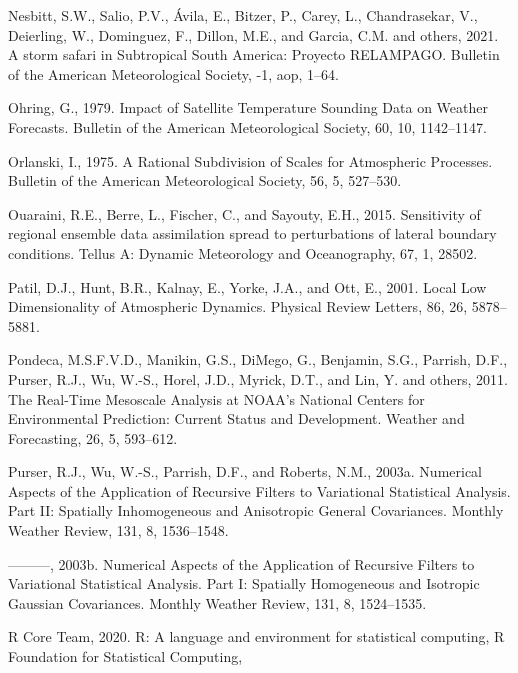 \documentclass[12pt,oneside]{reedthesis}
\begin{document}
\leavevmode\hypertarget{ref-nesbitt2021}{}%
Nesbitt, S.W., Salio, P.V., Ávila, E., Bitzer, P., Carey, L., Chandrasekar, V., Deierling, W., Dominguez, F., Dillon, M.E., and Garcia, C.M. and others, 2021. A storm safari in Subtropical South America: Proyecto RELAMPAGO. Bulletin of the American Meteorological Society, -1, aop, 1--64.

\leavevmode\hypertarget{ref-ohring1979}{}%
Ohring, G., 1979. Impact of Satellite Temperature Sounding Data on Weather Forecasts. Bulletin of the American Meteorological Society, 60, 10, 1142--1147.

\leavevmode\hypertarget{ref-orlanski1975}{}%
Orlanski, I., 1975. A Rational Subdivision of Scales for Atmospheric Processes. Bulletin of the American Meteorological Society, 56, 5, 527--530.

\leavevmode\hypertarget{ref-ouaraini2015}{}%
Ouaraini, R.E., Berre, L., Fischer, C., and Sayouty, E.H., 2015. Sensitivity of regional ensemble data assimilation spread to perturbations of lateral boundary conditions. Tellus A: Dynamic Meteorology and Oceanography, 67, 1, 28502.

\leavevmode\hypertarget{ref-patil2001}{}%
Patil, D.J., Hunt, B.R., Kalnay, E., Yorke, J.A., and Ott, E., 2001. Local Low Dimensionality of Atmospheric Dynamics. Physical Review Letters, 86, 26, 5878--5881.

\leavevmode\hypertarget{ref-pondeca2011}{}%
Pondeca, M.S.F.V.D., Manikin, G.S., DiMego, G., Benjamin, S.G., Parrish, D.F., Purser, R.J., Wu, W.-S., Horel, J.D., Myrick, D.T., and Lin, Y. and others, 2011. The Real-Time Mesoscale Analysis at NOAA's National Centers for Environmental Prediction: Current Status and Development. Weather and Forecasting, 26, 5, 593--612.

\leavevmode\hypertarget{ref-purser2003a}{}%
Purser, R.J., Wu, W.-S., Parrish, D.F., and Roberts, N.M., 2003a. Numerical Aspects of the Application of Recursive Filters to Variational Statistical Analysis. Part II: Spatially Inhomogeneous and Anisotropic General Covariances. Monthly Weather Review, 131, 8, 1536--1548.

\leavevmode\hypertarget{ref-purser2003}{}%
---------, 2003b. Numerical Aspects of the Application of Recursive Filters to Variational Statistical Analysis. Part I: Spatially Homogeneous and Isotropic Gaussian Covariances. Monthly Weather Review, 131, 8, 1524--1535.

\leavevmode\hypertarget{ref-rcoreteam2020}{}%
R Core Team, 2020. R: A language and environment for statistical computing, R Foundation for Statistical Computing,
\end{document}
